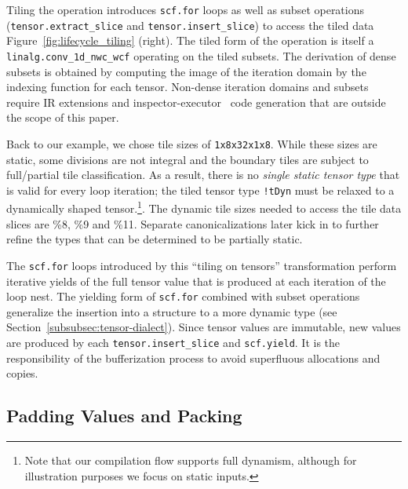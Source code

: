 Tiling the operation introduces \lstinline|scf.for| loops as well as subset operations (\lstinline|tensor.extract_slice| and \lstinline|tensor.insert_slice|) to access the tiled data Figure~\ref{fig:lifecycle_tiling} (right).
The tiled form of the operation is itself a \lstinline|linalg.conv_1d_nwc_wcf| operating on the tiled subsets.
The derivation of dense subsets is obtained by computing the image of the iteration domain by the indexing function for each tensor.
Non-dense iteration domains and subsets require IR extensions and inspector-executor~\cite{kjolstad2017taco}
code generation that are outside the scope of this paper.

Back to our example, we chose tile sizes of \lstinline|1x8x32x1x8|.
While these sizes are static, some divisions are not integral and the boundary tiles are subject to full/partial tile classification.
As a result, there is no \emph{single static tensor type} that is valid for every loop iteration; the tiled tensor type \lstinline|!tDyn| must be relaxed to a
dynamically shaped tensor.\footnote{Note that our compilation flow supports full dynamism, although for illustration purposes we focus on static inputs.}.
The dynamic tile sizes needed to access the tile data slices are \%8, \%9 and \%11.
Separate canonicalizations later kick in to further refine the types that can be determined to be partially static.

The \lstinline|scf.for| loops introduced by this ``tiling on tensors'' transformation 
perform iterative yields of the full tensor value that is produced at each iteration of
the loop nest. The yielding form of \lstinline|scf.for| combined with subset operations 
generalize the insertion into a structure to a more dynamic type (see Section~\ref{subsubsec:tensor-dialect}).
Since tensor values are immutable, new values are produced by each \lstinline|tensor.insert_slice| and \lstinline|scf.yield|. 
It is the responsibility of the bufferization process to avoid superfluous
allocations and copies.

\subsection{Padding Values and Packing}
\label{subsec:padding-values-and-packing}

